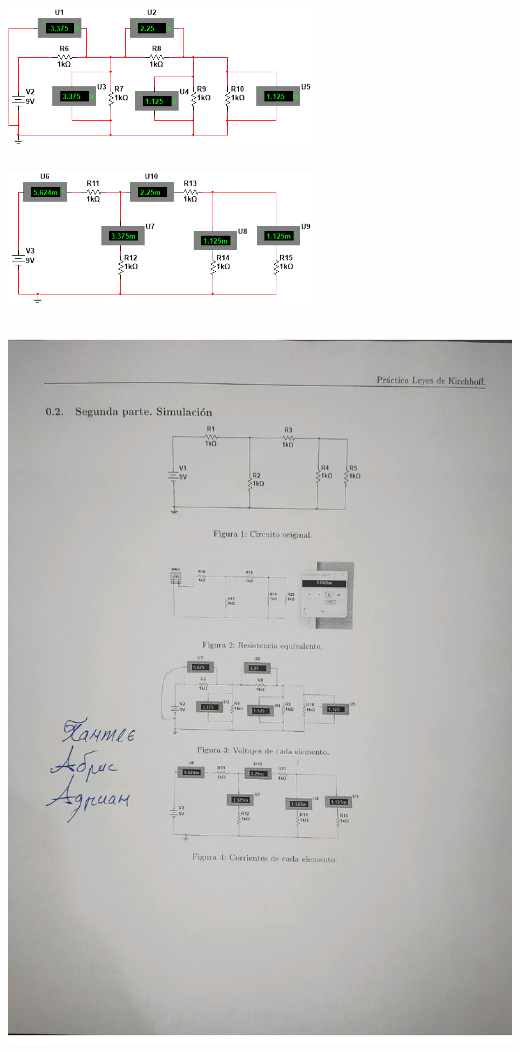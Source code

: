 \documentclass[10pt]{article}
\begin{document}
\begin{center}
	\includegraphics[width=8.075cm, height=3.791cm]{Imagenes/voltajes.png}
	
\end{center}
\begin{center}
	\includegraphics[width=8.075cm, height=3.791cm]{Imagenes/intensidad.png}
	
\end{center}
\begin{center}
	\includegraphics[width=14.5cm, height=18.86cm]{Imagenes/firma.jpg}
	
\end{center}
\newpage
\end{document}
